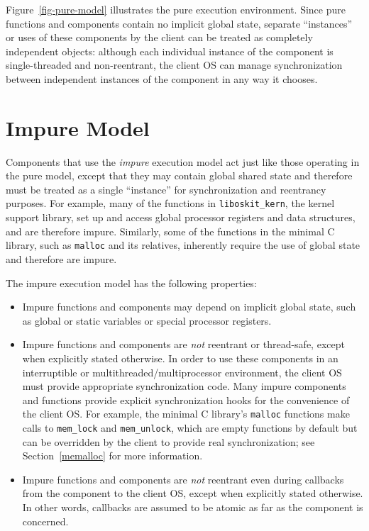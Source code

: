 
Figure~\ref{fig-pure-model} illustrates the pure execution environment.
Since pure functions and components contain no implicit global state,
separate ``instances'' or uses of these components by the client
can be treated as completely independent objects:
although each individual instance of the component
is single-threaded and non-reentrant,
the client OS can manage synchronization
between independent instances of the component
in any way it chooses.

\section{Impure Model}

Components that use the \emph{impure} execution model
act just like those operating in the pure model,
except that they may contain global shared state
and therefore must be treated as a single ``instance''
for synchronization and reentrancy purposes.
For example,
many of the functions in \texttt{liboskit_kern},
the kernel support library,
set up and access global processor registers and data structures,
and are therefore impure.
Similarly,
some of the functions in the minimal C library,
such as \texttt{malloc} and its relatives,
inherently require the use of global state
and therefore are impure.

The impure execution model has the following properties:
\begin{itemize}
\item	Impure functions and components may depend on implicit global state,
	such as global or static variables or special processor registers.
\item	Impure functions and components are \emph{not} reentrant or thread-safe,
	except when explicitly stated otherwise.
	In order to use these components
	in an interruptible or multithreaded/multiprocessor environment,
	the client OS must provide appropriate synchronization code.
	Many impure components and functions
	provide explicit synchronization hooks
	for the convenience of the client OS\@.
	For example, the minimal C library's \texttt{malloc} functions
	make calls to \texttt{mem_lock} and \texttt{mem_unlock},
	which are empty functions by default
	but can be overridden by the client to provide real synchronization;
	see Section~\ref{memalloc} for more information.
\item	Impure functions and components are \emph{not} reentrant
	even during callbacks from the component to the client OS,
	except when explicitly stated otherwise.
	In other words, callbacks are assumed to be atomic
	as far as the component is concerned.
\end{itemize}


